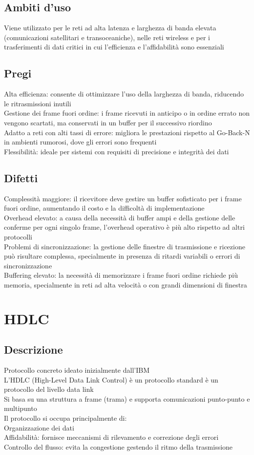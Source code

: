 \documentclass[10pt,oneside,a4paper]{article}
\begin{document}
\subsection{Ambiti d'uso}
Viene utilizzato per le reti ad alta latenza e larghezza di banda elevata (comunicazioni satellitari e transoceaniche), nelle reti wireless e per i trasferimenti di dati critici in cui l'efficienza e l'affidabilità sono essenziali
\subsection{Pregi}
Alta efficienza: consente di ottimizzare l'uso della larghezza di banda, riducendo le ritrasmissioni inutili\\
Gestione dei frame fuori ordine: i frame ricevuti in anticipo o in ordine errato non vengono scartati, ma conservati in un buffer per il successivo riordino\\
Adatto a reti con alti tassi di errore: migliora le prestazioni rispetto al Go-Back-N in ambienti rumorosi, dove gli errori sono frequenti\\
Flessibilità: ideale per sistemi con requisiti di precisione e integrità dei dati
\subsection{Difetti}
Complessità maggiore: il ricevitore deve gestire un buffer sofisticato per i frame fuori ordine, aumentando il costo e la difficoltà di implementazione\\
Overhead elevato: a causa della necessità di buffer ampi e della gestione delle conferme per ogni singolo frame, l'overhead operativo è più alto rispetto ad altri protocolli\\
Problemi di sincronizzazione: la gestione delle finestre di trasmissione e ricezione può risultare complessa, specialmente in presenza di ritardi variabili o errori di sincronizzazione\\
Buffering elevato: la necessità di memorizzare i frame fuori ordine richiede più memoria, specialmente in reti ad alta velocità o con grandi dimensioni di finestra
\section{HDLC}
\subsection{Descrizione}
Protocollo concreto ideato inizialmente dall'IBM\\
L'HDLC (High-Level Data Link Control) è un protocollo standard è un protocollo del livello data link\\
Si basa su una struttura a frame (trama) e supporta comunicazioni punto-punto e multipunto\\
Il protocollo si occupa principalmente di:\\
Organizzazione dei dati\\
Affidabilità: fornisce meccanismi di rilevamento e correzione degli errori\\
Controllo del flusso: evita la congestione gestendo il ritmo della trasmissione
\end{document}
